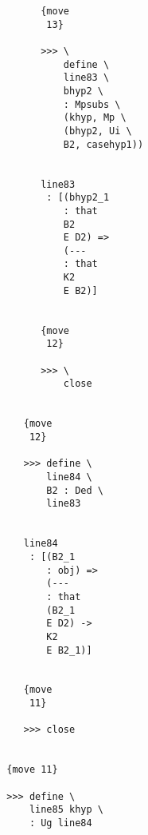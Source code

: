 \documentclass[12pt]{article}
\begin{document}
\begin{verbatim}
                                       {move 
                                        13}

                                       >>> \
                                           define \
                                           line83 \
                                           bhyp2 \
                                           : Mpsubs \
                                           (khyp, Mp \
                                           (bhyp2, Ui \
                                           B2, casehyp1))


                                       line83 
                                        : [(bhyp2_1 
                                           : that 
                                           B2 
                                           E D2) => 
                                           (--- 
                                           : that 
                                           K2 
                                           E B2)]


                                       {move 
                                        12}

                                       >>> \
                                           close


                                    {move 
                                     12}

                                    >>> define \
                                        line84 \
                                        B2 : Ded \
                                        line83


                                    line84 
                                     : [(B2_1 
                                        : obj) => 
                                        (--- 
                                        : that 
                                        (B2_1 
                                        E D2) -> 
                                        K2 
                                        E B2_1)]


                                    {move 
                                     11}

                                    >>> close


                                 {move 11}

                                 >>> define \
                                     line85 khyp \
                                     : Ug line84



\end{verbatim}
\end{document}
